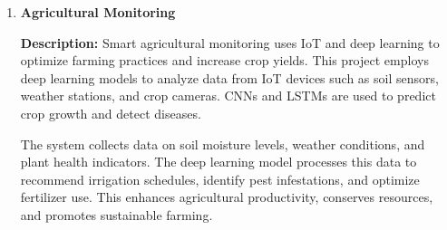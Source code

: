\documentclass{article}
\begin{document}
\begin{enumerate}[label=\textbf{\arabic*.}, leftmargin=*]
\vspace{24pt} %
\item \textbf{Agricultural Monitoring}

\textbf{Description:}
Smart agricultural monitoring uses IoT and deep learning to optimize farming practices and increase crop yields. This project employs deep learning models to analyze data from IoT devices such as soil sensors, weather stations, and crop cameras. CNNs and LSTMs are used to predict crop growth and detect diseases.

The system collects data on soil moisture levels, weather conditions, and plant health indicators. The deep learning model processes this data to recommend irrigation schedules, identify pest infestations, and optimize fertilizer use. This enhances agricultural productivity, conserves resources, and promotes sustainable farming.



\end{enumerate}
\end{document}
